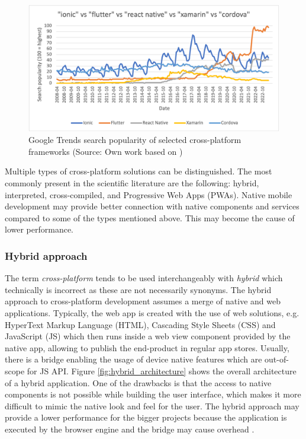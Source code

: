 \begin{figure}[h]
	\centering
	\includegraphics[width=\textwidth]{img/google_trends_comparison}
	\caption{Google Trends search popularity of selected cross-platform frameworks (Source: Own work based on \cite{trends_comparison})}
	\label{fig:trends_comparison}
\end{figure}

Multiple types of cross-platform solutions can be distinguished. The most commonly present in the scientific literature are the following: hybrid, interpreted, cross-compiled, and Progressive Web Apps (PWAs). Native mobile development may provide better connection with native components and services compared to some of the types mentioned above. This may become the cause of lower performance. 

\subsubsection*{Hybrid approach}

The term \emph{cross-platform} tends to be used interchangeably with \emph{hybrid} which technically is incorrect as these are not necessarily synonyms. The hybrid approach to cross-platform development assumes a merge of native and web applications. Typically, the web app is created with the use of web solutions, e.g. HyperText Markup Language (HTML), Cascading Style Sheets (CSS) and JavaScript (JS) which then runs inside a web view component provided by the native app, allowing to publish the end-product in regular app stores. Usually, there is a bridge enabling the usage of device native features which are out-of-scope for JS API. Figure \ref{fig:hybrid_architecture} shows the overall architecture of a hybrid application. One of the drawbacks is that the access to native components is not possible while building the user interface, which makes it more difficult to mimic the native look and feel for the user. The hybrid approach may provide a lower performance for the bigger projects because the application is executed by the browser engine and the bridge may cause overhead \cite{survey_taxonomy_cross_platform,comparison_technologies_multiplatform,cross_platform_development_study_rn_flutter,eval_rn_flutter,comp_analysis_hybrid_frameworks}.

